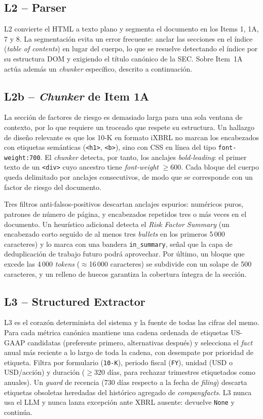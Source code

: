 \documentclass[conference]{IEEEtran}
\begin{document}
\subsection{L2 -- Parser}
L2 convierte el HTML a texto plano y segmenta el documento en los Items 1, 1A, 7
y 8. La segmentación evita un error frecuente: anclar las secciones en el índice
(\textit{table of contents}) en lugar del cuerpo, lo que se resuelve detectando
el índice por su estructura DOM y exigiendo el título canónico de la SEC. Sobre
Item~1A actúa además un \textit{chunker} específico, descrito a continuación.

\subsection{L2b -- \textit{Chunker} de Item 1A}
La sección de factores de riesgo es demasiado larga para una sola ventana de
contexto, por lo que requiere un troceado que respete su estructura. Un hallazgo
de diseño relevante es que los 10-K en formato iXBRL no marcan los encabezados
con etiquetas semánticas (\texttt{<h1>}, \texttt{<b>}), sino con CSS en línea del
tipo \texttt{font-weight:700}. El \textit{chunker} detecta, por tanto, los
anclajes \textit{bold-leading}: el primer texto de un \texttt{<div>} cuyo ancestro
tiene \textit{font-weight} $\geq$600. Cada bloque del cuerpo queda delimitado por
anclajes consecutivos, de modo que se corresponde con un factor de riesgo del
documento.

Tres filtros anti-falsos-positivos descartan anclajes espurios: numéricos puros,
patrones de número de página, y encabezados repetidos tres o más veces en el
documento. Un heurístico adicional detecta el \textit{Risk Factor Summary} (un
encabezado corto seguido de al menos tres \textit{bullets} en los primeros 5\,000
caracteres) y lo marca con una bandera \texttt{in\_summary}, señal que la capa de
deduplicación de trabajo futuro podrá aprovechar. Por último, un bloque que excede
las 4\,000 \textit{tokens} ($\approx$16\,000 caracteres) se subdivide con un
solape de 500 caracteres, y un relleno de huecos garantiza la cobertura íntegra de
la sección.

\subsection{L3 -- Structured Extractor}
L3 es el corazón determinista del sistema y la fuente de todas las cifras del
memo. Para cada métrica canónica mantiene una cadena ordenada de etiquetas
US-GAAP candidatas (preferente primero, alternativas después) y selecciona el
\textit{fact} anual más reciente a lo largo de toda la cadena, con desempate por
prioridad de etiqueta. Filtra por formulario (\texttt{10-K}), periodo fiscal
(\texttt{FY}), unidad (USD o USD/acción) y duración ($\geq$320 días, para
rechazar trimestres etiquetados como anuales). Un \textit{guard} de recencia
(730 días respecto a la fecha de \textit{filing}) descarta etiquetas obsoletas
heredadas del histórico agregado de \textit{companyfacts}. L3 nunca usa el LLM y
nunca lanza excepción ante XBRL ausente: devuelve \texttt{None} y continúa.
\end{document}

